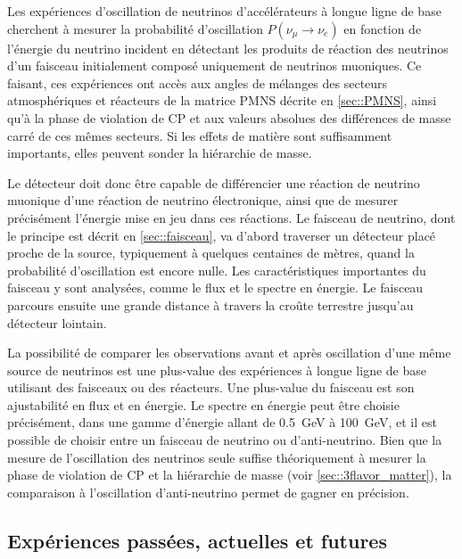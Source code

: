             Les expériences d'oscillation de neutrinos d'accélérateurs à longue ligne de base cherchent à mesurer la probabilité d'oscillation $P(\nu_{\mu}\to \nu_e)$ en fonction de l'énergie du neutrino incident en détectant les produits de réaction des neutrinos d'un faisceau initialement composé uniquement de neutrinos muoniques. Ce faisant, ces expériences ont accès aux angles de mélanges des secteurs atmosphériques et réacteurs de la matrice PMNS décrite en \autoref{sec::PMNS}, ainsi qu'à la phase de violation de CP et aux valeurs absolues des différences de masse carré de ces mêmes secteurs. Si les effets de matière sont suffisamment importants, elles peuvent sonder la hiérarchie de masse.
            
            Le détecteur doit donc être capable de différencier une réaction de neutrino muonique d'une réaction de neutrino électronique, ainsi que de mesurer précisément l'énergie mise en jeu dans ces réactions. Le faisceau de neutrino, dont le principe est décrit en \autoref{sec::faisceau}, va d'abord traverser un détecteur placé proche de la source, typiquement à quelques centaines de mètres, quand la probabilité d'oscillation est encore nulle. Les caractéristiques importantes du faisceau y sont analysées, comme le flux et le spectre en énergie. Le faisceau parcours ensuite une grande distance à travers la croûte terrestre jusqu'au détecteur lointain. 
            
            La possibilité de comparer les observations avant et après oscillation d'une même source de neutrinos est une plus-value des expériences à longue ligne de base utilisant des faisceaux ou des réacteurs. Une plus-value du faisceau est son ajustabilité en flux et en énergie. Le spectre en énergie peut être choisie précisément, dans une gamme d'énergie allant de \SI{0.5}{\giga\electronvolt} à \SI{100}{\giga\electronvolt}, et il est possible de choisir entre un faisceau de neutrino ou d'anti-neutrino. Bien que la mesure de l'oscillation des neutrinos seule suffise théoriquement à mesurer la phase de violation de CP et la hiérarchie de masse (voir \autoref{sec::3flavor_matter}), la comparaison à l'oscillation d'anti-neutrino permet de gagner en précision.    
                    
        \subsection{Expériences passées, actuelles et futures}
        
